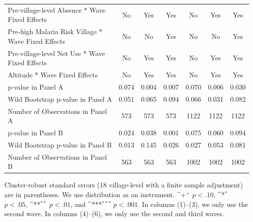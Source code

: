 \documentclass[fleqn,11pt]{article}
\newcommand{\sym}[1]{\rlap{$#1$}}
\def\sym#1{\ifmmode^{#1}\else\(^{#1}\)\fi
}
\begin{document}
\begin{table}[h]
\begin{adjustbox}{max width=\textwidth}
\begin{threeparttable}
\begin{tabular}{l*{6}{c}}
Pre-village-level Absence * Wave Fixed Effects&          No         &         Yes         &         Yes         &          No         &         Yes         &         Yes         \\

Pre-high Malaria Risk Village * Wave Fixed Effects &          No         &          No         &         Yes         &          No         &          No         &         Yes         \\
Pre-village-level Net Use * Wave Fixed Effects&         No         &         Yes         &         Yes        & No         &         Yes         &         Yes    \\

Altitude * Wave Fixed Effects&         No         &         Yes         &         Yes        & No         &         Yes         &         Yes   \\
\hline
   p-value  in Panel A&       0.074         &       0.004         &       0.007         &       0.070         &       0.006         &       0.030  \\
  Wild Bootstrap p-value  in Panel A&       0.051         &       0.065         &       0.094         &       0.066         &       0.031         &       0.082  \\    
Number of Observations in Panel A       &         573         &         573         &      573         &        1122  &    1122         &        1122         \\
            p-value in Panel B         &       0.024         &       0.038         &       0.001         &       0.075         &       0.060         &       0.094         \\
Wild Bootstrap p-value in Panel B &       0.013         &       0.145         &       0.026         &       0.027         &       0.053         &       0.081         \\

Number of Observations in Panel B       &          563         &         563         &         563         &        1002         &        1002         &        1002            \\
\hline\hline
\end{tabular}
\begin{tablenotes}
\item Cluster-robust standard errors (18 village-level with a finite sample adjustment) are in parentheses. We use distribution as an instrument. \sym{+} \(p<.10\), \sym{*} \(p<.05\), \sym{**} \(p<.01\), and \sym{***} \(p<.001\). In columns (1)--(3), we only use the second wave. In columns (4)--(6), we only use the second and third waves. 
\end{tablenotes}
\end{threeparttable}
\end{adjustbox}
\end{table}
\end{document}
